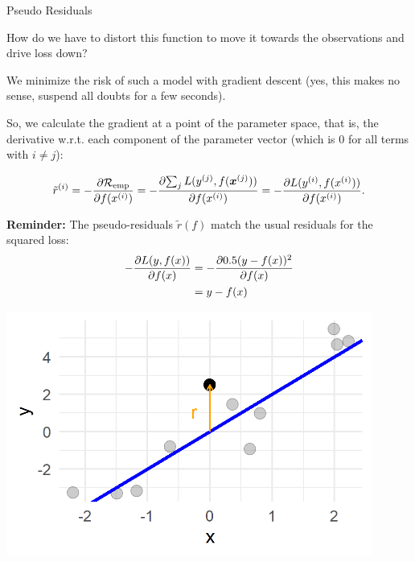 \begin{vbframe}{Pseudo Residuals}
\begin{footnotesize}
How do we have to distort this function to move it towards the observations and drive loss down?

\vspace*{0.2cm}
We minimize the risk of such a model with gradient descent (yes, this makes no sense,
suspend all doubts for a few seconds).

So, we calculate the gradient at a point of the parameter space, that is, the derivative w.r.t. each component of the parameter vector (which is 0 for all terms with $i \neq j$):

$$
\tilde{r}^{(i)} = - \frac{\partial{\mathcal{R}_{\text{emp}}}}{\partial f(x^{(i)})} = - \frac{\partial{\sum_j L(y^{(j)}, f(\bm{x}^{(j)}))}}{\partial f(x^{(i)})} = - \frac{\partial{L(y^{(i)}, f(x^{(i)}))}}{\partial f(x^{(i)})}.
$$

\vspace*{0.5cm}

\begin{minipage}[b]{0.45\textwidth}
  \raggedright
  \textbf{Reminder:} The pseudo-residuals 
  $\tilde{r}\left( f \right)$ 
  match the usual residuals for 
  the squared loss:
  \begin{align*}
  - \frac{\partial{L(y, f(x))}}{\partial f(x)} & = - \frac{\partial{0.5(y - f(x))^2}}{\partial f(x)}\\ 
                   & = y - f(x)
  \end{align*}
\end{minipage}%
\begin{minipage}[b]{0.05\textwidth}
   \phantom{foo}
\end{minipage}
\begin{minipage}[b]{0.45\textwidth}
  \includegraphics[width=0.9\textwidth]{figure/pseudo_residual_1.png}
\end{minipage}

\end{footnotesize}

\end{vbframe}

